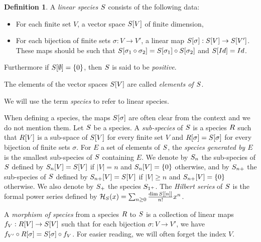 \documentclass[11pt]{article}
\theoremstyle{definition}
\newtheorem{defi}[theo]{Definition}
\numberwithin{equation}{section}
\newcommand{\set}[1]{\left\{#1\right\}}
\newcommand{\spe}[1]{\normalfont{\textsc{#1}}}
\newcommand{\card}[1]{|#1|}
\newcommand{\id}{Id}
\newcommand{\hilbert}[1]{\mathcal{H}_{#1}}
\begin{document}
\begin{defi}
    A {\em linear species} $\spe{S}$ consists of the following data:
    \begin{itemize}
       \item For each finite set $V$, a vector space $\spe{S}[V]$ of finite dimension,
       \item For each bijection of finite sets $\sigma: V\to V'$, a linear map 
       $\spe{S}[\sigma]:\spe{S}[V]\to \spe{S}[V']$.
       These maps should be such that 
       $\spe{S}[\sigma_1\circ\sigma_2] = \spe{S}[\sigma_1]\circ \spe{S}[\sigma_2]$ 
       and $\spe{S}[\id] = \id$.
    \end{itemize}
    Furthermore if $\spe{S}[\emptyset]  = \set{0}$, then $\spe{S}$ is said to be {\em positive}.
    
    The elements of the vector spaces $\spe{S}[V]$ are called {\em elements of $\spe{S}$}.
\end{defi}

We will use the term {\em species} to refer to linear species.

When defining a species, the maps $\spe{S}[\sigma]$ are often clear from the context and we do not mention them.
Let $\spe{S}$ be a species. A {\em sub-species} of $\spe{S}$ is a species $\spe{R}$ such that $\spe{R}[V]$ is 
a sub-space of $\spe{S}[V]$ for every finite set $V$ and $\spe{R}[\sigma] = \spe{S}[\sigma]$ for every
bijection of finite sets $\sigma$. 
For $E$ a set of elements of $\spe{S}$, the {\em species generated by $E$} is the smallest sub-species of
$\spe{S}$ containing $E$.
We denote by $\spe{S}_{n}$ the sub-species of $\spe{S}$ defined by $\spe{S}_{n}[V]=\spe{S}[V]$ if 
$\card{V} = n$ and $\spe{S}_n[V]=\set{0}$ otherwise, and by $\spe{S}_{n+}$ the sub-species of $\spe{S}$
defined by $\spe{S}_{n+}[V]=\spe{S}[V]$ if $\card{V}\geq n$ and $\spe{S}_{n+}[V]=\set{0}$ otherwise.
We also denote by $\spe{S}_+$ the species $\spe{S}_{1^+}$. The {\em Hilbert series} of $\spe{S}$ is the 
formal power series defined by 
$\hilbert{\spe{S}}(x)=\sum_{n\geq 0}\frac{\dim\spe{S}[[n]]}{n!}x^n$.

A {\em morphism of species} from a species $\spe{R}$ to $\spe{S}$ is a collection of linear maps 
$f_V : \spe{R}[V] \to \spe{S}[V]$ such that for each bijection $\sigma: V\to V'$, we have 
$f_{V'}\circ \spe{R}[\sigma] = \spe{S}[\sigma]\circ f_V$. For easier reading, we will often forget 
the index $V$. 
\end{document}
